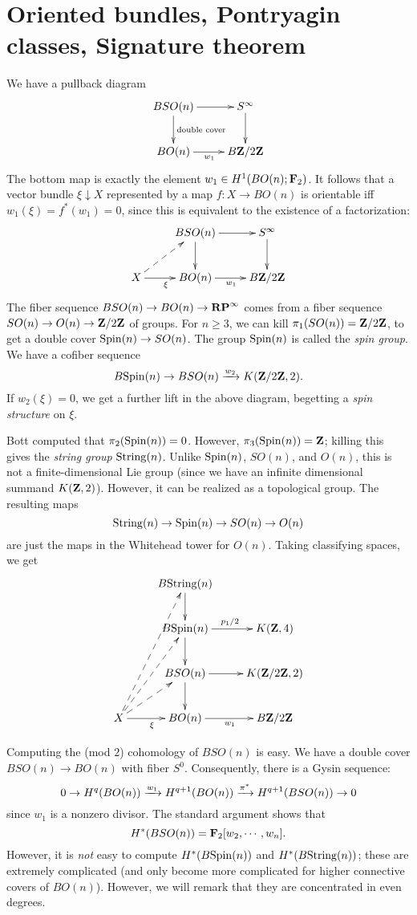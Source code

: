 \section{Oriented bundles, Pontryagin classes, Signature theorem}
We have a pullback diagram
$$
\xymatrix{
    BSO(n)\ar[r]\ar[d]^{\text{double cover}} & S^\infty\ar[d]\\
    BO(n)\ar[r]_{w_1} & B\Z/2\Z
}
$$
The bottom map is exactly the element $w_1\in H^1(BO(n);\mathbf F_2)$. It follows
that a vector bundle $\xi\downarrow X$ represented by a map $f:X\to BO(n)$ is
orientable iff $w_1(\xi) = f^\ast(w_1) = 0$, since this is equivalent to the
existence of a factorization:
$$
\xymatrix{
    & BSO(n)\ar[r]\ar[d] & S^\infty\ar[d]\\
    X\ar@{-->}[ur]\ar[r]_{\xi} & BO(n)\ar[r]_{w_1} & B\Z/2\Z
}
$$
The fiber sequence $BSO(n)\to BO(n)\to \mathbf{RP}^\infty$ comes from a fiber sequence
$SO(n)\to O(n)\to\mathbf Z/2\mathbf Z$ of groups. For $n\geq 3$, we can kill $\pi_1(SO(n)) =
\mathbf Z/2\mathbf Z$,
to get a double cover $\mathrm{Spin}(n)\to SO(n)$. The group $\mathrm{Spin}(n)$ is called the
\emph{spin group}. We have a cofiber sequence
$$B\mathrm{Spin}(n)\to BSO(n)\xrightarrow{{w_2}} K(\mathbf Z/2\mathbf Z,2).$$
If $w_2(\xi) = 0$, we get a further lift in the above diagram, begetting a
\emph{spin structure} on $\xi$.

Bott computed that $\pi_2(\mathrm{Spin}(n)) = 0$. However, $\pi_3(\mathrm{Spin}(n)) = \mathbf Z$;
killing this gives the \emph{string group} $\mathrm{String}(n)$. Unlike $\mathrm{Spin}(n)$,
$SO(n)$, and $O(n)$, this is not a finite-dimensional Lie group (since we have
an infinite dimensional summand $K(\mathbf Z,2)$). However, it can be realized as a
topological group. The resulting maps $$\mathrm{String}(n)\to \mathrm{Spin}(n)\to SO(n)\to
O(n)$$ are just the maps in the Whitehead tower for $O(n)$. Taking classifying
spaces, we get
$$
\xymatrix{
    & B\String(n)\ar[d] & \\
    & B\Spin(n)\ar[d] \ar[r]^{p_1/2} & K(\Z,4)\\
    & BSO(n)\ar[r]\ar[d] & K(\Z/2\Z,2)\\
    X\ar@{-->}[ur]\ar@{-->}[uur]\ar@{-->}[uuur]\ar[r]_{\xi} & BO(n)\ar[r]_{w_1}
    & B\Z/2\Z
}
$$

Computing the (mod $2$) cohomology of $BSO(n)$ is easy. We have a double cover
$BSO(n)\to BO(n)$ with fiber $S^0$. Consequently, there is a Gysin sequence:
$$
0\to H^q(BO(n)) \xrightarrow{{w_1}} H^{q+1}(BO(n)) \xrightarrow{{\pi^\ast}} H^{q+1}(BSO(n)) \to 0
$$
since $w_1$ is a nonzero divisor. The standard argument shows that
$$
H^\ast(BSO(n)) = \mathbf F_2[w_2,\cdots,w_n].
$$
However, it is \emph{not} easy to compute $H^\ast(B\mathrm{Spin}(n))$ and
$H^\ast(B\mathrm{String}(n))$; these are extremely complicated (and only become more
complicated for higher connective covers of $BO(n)$). However, we will remark
that they are concentrated in even degrees.

